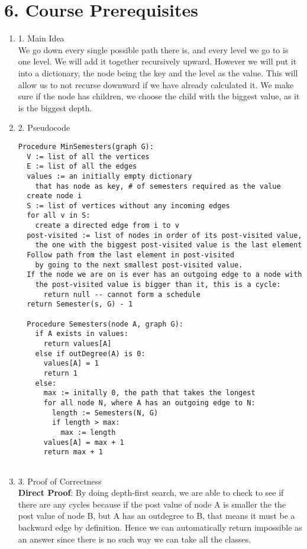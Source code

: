 \documentclass[11pt]{article}
\newenvironment{qparts}{\begin{enumerate}[{(}a{)}]}{\end{enumerate}}
\begin{document}
\section*{6. Course Prerequisites}
\begin{qparts}
\item[1.] Main Idea\\
We go down every single possible path there is, and every level we go to is one level. We will add it together recursively upward. However we will put it into a dictionary, the node being the key and the level as the value. This will allow us to not recurse downward if we have already calculated it. We make sure if the node has children, we choose the child with the biggest value, as it is the biggest depth. 
\item[2.] Pseudocode 
\begin{verbatim}
Procedure MinSemesters(graph G):
  V := list of all the vertices
  E := list of all the edges
  values := an initially empty dictionary 
    that has node as key, # of semesters required as the value
  create node i
  S := list of vertices without any incoming edges
  for all v in S:
    create a directed edge from i to v
  post-visited := list of nodes in order of its post-visited value, 
    the one with the biggest post-visited value is the last element
  Follow path from the last element in post-visited 
    by going to the next smallest post-visited value.
  If the node we are on is ever has an outgoing edge to a node with 
    the post-visited value is bigger than it, this is a cycle:
      return null -- cannot form a schedule
  return Semester(s, G) - 1
  
  Procedure Semesters(node A, graph G):
    if A exists in values:
      return values[A]
    else if outDegree(A) is 0: 
      values[A] = 1
      return 1
    else:
      max := initally 0, the path that takes the longest
      for all node N, where A has an outgoing edge to N:
        length := Semesters(N, G)
        if length > max:
          max := length
      values[A] = max + 1
      return max + 1
    
\end{verbatim}
\item[3.] Proof of Correctness\\
\textbf{Direct Proof}: By doing depth-first search, we are able to check to see if there are any cycles because if the post value of node A is smaller the the post value of node B, but A has an outdegree to B, that means it must be a backward edge by definition. Hence we can automatically return impossible as an answer since there is no such way we can take all the classes. \\


\end{qparts}
\end{document}
